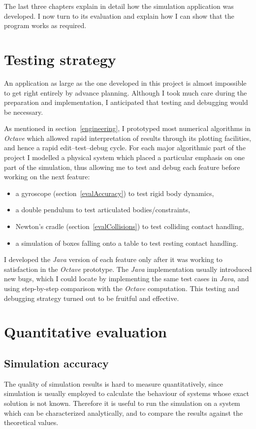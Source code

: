 The last three chapters explain in detail how the simulation application was developed. I now
turn to its evaluation and explain how I can show that the program works as required.

\section{Testing strategy}

An application as large as the one developed in this project is almost impossible to get right
entirely by advance planning. Although I took much care during the preparation and implementation,
I anticipated that testing and debugging would be necessary.

As mentioned in section~\ref{engineering}, I prototyped most numerical algorithms in
\textsl{Octave} which allowed rapid interpretation of results through its plotting facilities,
and hence a rapid edit--test--debug cycle. For each major algorithmic part of the project
I modelled a physical system which placed a particular emphasis on one part of the simulation,
thus allowing me to test and debug each feature before working on the next feature:
\begin{itemize}
\item a gyroscope (section~\ref{evalAccuracy}) to test rigid body dynamics,
\item a double pendulum to test articulated bodies/constraints,
\item Newton's cradle (section~\ref{evalCollisions}) to test colliding contact handling,
\item a simulation of boxes falling onto a table to test resting contact handling.
\end{itemize}

I developed the \textsl{Java} version of each feature only after it was working to satisfaction in
the \textsl{Octave} prototype. The \textsl{Java} implementation usually introduced new bugs, which
I could locate by implementing the same test cases in \textsl{Java}, and using step-by-step
comparison with the \textsl{Octave} computation. This testing and debugging strategy turned out
to be fruitful and effective.


\section{Quantitative evaluation}
\subsection{Simulation accuracy\label{evalAccuracy}}
The quality of simulation results is hard to measure quantitatively, since simulation is usually
employed to calculate the behaviour of systems whose exact solution is not known. Therefore it is
useful to run the simulation on a system which can be characterized analytically, and to compare
the results against the theoretical values.

